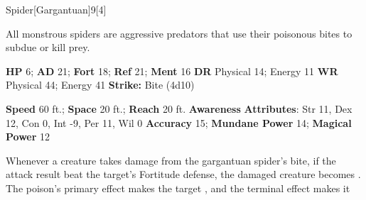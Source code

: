   \begin{monsection}{Spider}[Gargantuan]{9}[4]
    \vspace{-1em}\vspace{-1em}
    \vspace{0em}

    
    All monstrous spiders are aggressive predators that use their poisonous bites to subdue or kill prey.
  

    \begin{spellcontent}
      \begin{spelltargetinginfo}
        \pari \textbf{HP} 6;
          \textbf{AD} 21;
          \textbf{Fort} 18;
          \textbf{Ref} 21;
          \textbf{Ment} 16
        \pari \textbf{DR} Physical 14; Energy 11
        \pari \textbf{WR} Physical 44; Energy 41
        \pari \textbf{Strike:}
            Bite  (4d10)
      \end{spelltargetinginfo}
    \end{spellcontent}
    \begin{monsterfooter}
      \pari \textbf{Speed} 60 ft.;
        \textbf{Space} 20 ft.;
        \textbf{Reach} 20 ft.
      \pari \textbf{Awareness} 
      \pari \textbf{Attributes}:
        Str 11, Dex 12,
        Con 0, Int -9,
        Per 11, Wil 0
      \pari \textbf{Accuracy} 15;
        \textbf{Mundane Power} 14;
      \textbf{Magical Power} 12
    \end{monsterfooter}
  \end{monsection}
    Whenever a creature takes damage from the gargantuan spider's bite,
      if the attack result beat the target's Fortitude defense,
      the damaged creature becomes .
    The poison's primary effect makes the target , and the terminal effect makes it 
  

